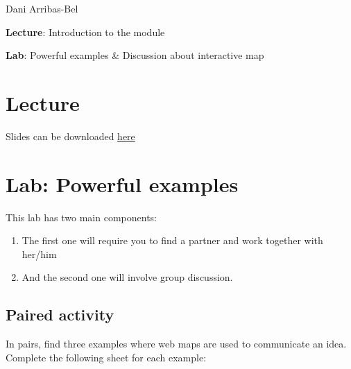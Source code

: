 \documentclass[
  letterpaper,
  DIV=11,
  numbers=noendperiod]{scrreprt}
\begin{document}
Dani Arribas-Bel

\textbf{Lecture}: Introduction to the module

\textbf{Lab}: Powerful examples \& Discussion about interactive map

\hypertarget{lecture}{%
\section{Lecture}\label{lecture}}

Slides can be downloaded
\href{https://github.com/GDSL-UL/wma/raw/main/pdf/lecture_01.pdf}{here}

\hypertarget{lab-powerful-examples}{%
\section{Lab: Powerful examples}\label{lab-powerful-examples}}

This lab has two main components:

\begin{enumerate}
\def\labelenumi{\arabic{enumi}.}
\item
  The first one will require you to find a partner and work together
  with her/him
\item
  And the second one will involve group discussion.
\end{enumerate}

\hypertarget{paired-activity}{%
\subsection{Paired activity}\label{paired-activity}}

In pairs, find three examples where web maps are used to communicate an
idea. Complete the following sheet for each example:
\end{document}
